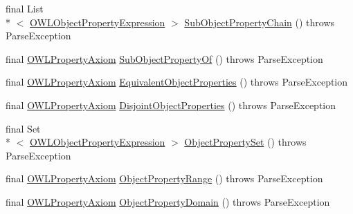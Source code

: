 \begin{DoxyCompactItemize}
\item 
final List\\*
$<$ \hyperlink{interfaceorg_1_1semanticweb_1_1owlapi_1_1model_1_1_o_w_l_object_property_expression}{O\-W\-L\-Object\-Property\-Expression} $>$ \hyperlink{classorg_1_1coode_1_1owlapi_1_1functionalparser_1_1_o_w_l_functional_syntax_parser_a48999aad03061bd633b868cce899abf7}{Sub\-Object\-Property\-Chain} ()  throws Parse\-Exception 
\item 
final \hyperlink{interfaceorg_1_1semanticweb_1_1owlapi_1_1model_1_1_o_w_l_property_axiom}{O\-W\-L\-Property\-Axiom} \hyperlink{classorg_1_1coode_1_1owlapi_1_1functionalparser_1_1_o_w_l_functional_syntax_parser_a41eb167e2db5bc0774b7416225493943}{Sub\-Object\-Property\-Of} ()  throws Parse\-Exception 
\item 
final \hyperlink{interfaceorg_1_1semanticweb_1_1owlapi_1_1model_1_1_o_w_l_property_axiom}{O\-W\-L\-Property\-Axiom} \hyperlink{classorg_1_1coode_1_1owlapi_1_1functionalparser_1_1_o_w_l_functional_syntax_parser_a0e1708ec6d376902bfffbfe891530265}{Equivalent\-Object\-Properties} ()  throws Parse\-Exception 
\item 
final \hyperlink{interfaceorg_1_1semanticweb_1_1owlapi_1_1model_1_1_o_w_l_property_axiom}{O\-W\-L\-Property\-Axiom} \hyperlink{classorg_1_1coode_1_1owlapi_1_1functionalparser_1_1_o_w_l_functional_syntax_parser_a889d86f9269fb19d59fbf0f42101ecac}{Disjoint\-Object\-Properties} ()  throws Parse\-Exception 
\item 
final Set\\*
$<$ \hyperlink{interfaceorg_1_1semanticweb_1_1owlapi_1_1model_1_1_o_w_l_object_property_expression}{O\-W\-L\-Object\-Property\-Expression} $>$ \hyperlink{classorg_1_1coode_1_1owlapi_1_1functionalparser_1_1_o_w_l_functional_syntax_parser_a152f73b83e769b03453f2250c991d015}{Object\-Property\-Set} ()  throws Parse\-Exception 
\item 
final \hyperlink{interfaceorg_1_1semanticweb_1_1owlapi_1_1model_1_1_o_w_l_property_axiom}{O\-W\-L\-Property\-Axiom} \hyperlink{classorg_1_1coode_1_1owlapi_1_1functionalparser_1_1_o_w_l_functional_syntax_parser_a4da72255465a524d8edd55c47cf26981}{Object\-Property\-Range} ()  throws Parse\-Exception 
\item 
final \hyperlink{interfaceorg_1_1semanticweb_1_1owlapi_1_1model_1_1_o_w_l_property_axiom}{O\-W\-L\-Property\-Axiom} \hyperlink{classorg_1_1coode_1_1owlapi_1_1functionalparser_1_1_o_w_l_functional_syntax_parser_a3e2563e9ed17f244a574baa046decca7}{Object\-Property\-Domain} ()  throws Parse\-Exception 

\end{DoxyCompactItemize}
